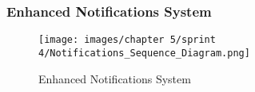 \subsubsection*{Enhanced Notifications System}
\begin{figure}[H]
    \centering
    \texttt{[image: images/chapter 5/sprint 4/Notifications\_Sequence\_Diagram.png]}
    \caption{Enhanced Notifications System}
    \label{fig:notifications-sequence-diagram}
\end{figure}
